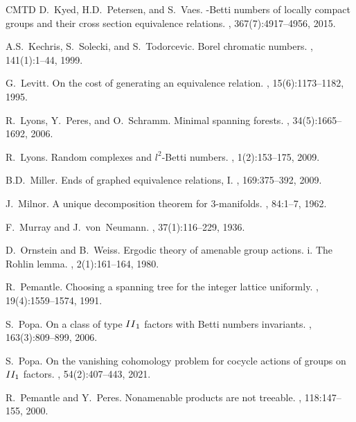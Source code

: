 \documentclass[11pt]{amsart}
\theoremstyle{definition}
\theoremstyle{plain}
\newcommand{\<}{\langle}
\renewcommand{\>}{\rangle}
\begin{document}
\begin{thebibliography}{CMTD}
D.~Kyed, H.D.~Petersen, and S.~Vaes.
-{B}etti numbers of locally compact groups and their cross
  section equivalence relations.
, 367(7):4917--4956, 2015.

A.S.~Kechris, S.~Solecki, and S.~Todorcevic.
\newblock Borel chromatic numbers.
, 141(1):1--44, 1999.

G.~Levitt.
\newblock On the cost of generating an equivalence relation.
, 15(6):1173--1182, 1995.

R.~Lyons, Y.~Peres, and O.~Schramm.
\newblock Minimal spanning forests.
, 34(5):1665--1692, 2006.


R.~Lyons.
\newblock Random complexes and {$l^2$}-{B}etti numbers.
, 1(2):153--175, 2009.

B.D.~Miller.
\newblock Ends of graphed equivalence relations, {I}.
, 169:375--392, 2009.


J.~Milnor.
\newblock A unique decomposition theorem for {$3$}-manifolds.
, 84:1--7, 1962.

F.~Murray and J.~von~Neumann.
, 37(1):116--229, 1936.

D.~Ornstein and B.~Weiss.
\newblock Ergodic theory of amenable group actions. i. {T}he {R}ohlin lemma.
, 2(1):161--164, 1980.

R.~Pemantle.
\newblock Choosing a spanning tree for the integer lattice uniformly.
, 19(4):1559--1574, 1991.

S.~Popa.
\newblock On a class of type {${\rm II}\sb 1$} factors with {B}etti numbers
  invariants.
, 163(3):809--899, 2006.

S.~Popa.
\newblock On the vanishing cohomology problem for cocycle actions of groups on
  {$\rm II_1$} factors.
, 54(2):407--443, 2021.


R.~Pemantle and Y.~Peres.
\newblock Nonamenable products are not treeable.
, 118:147--155, 2000.


\end{thebibliography}
\end{document}

